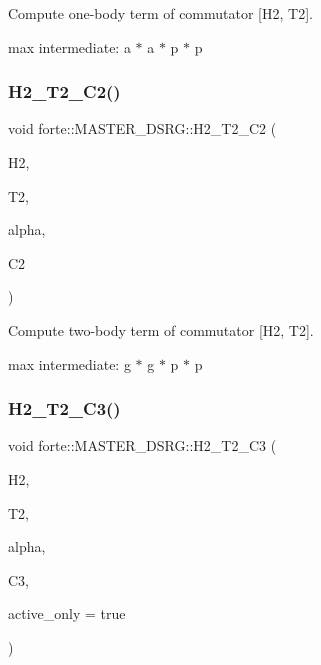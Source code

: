 Compute one-\/body term of commutator \mbox{[}H2, T2\mbox{]}. 

max intermediate\+: a $\ast$ a $\ast$ p $\ast$ p \mbox{\label{classforte_1_1_m_a_s_t_e_r___d_s_r_g_a39a44ecb9997a978aecd58d470712c1c}} 
\subsubsection{\texorpdfstring{H2\+\_\+\+T2\+\_\+\+C2()}{H2\_T2\_C2()}}
{\footnotesize\ttfamily void forte\+::\+M\+A\+S\+T\+E\+R\+\_\+\+D\+S\+R\+G\+::\+H2\+\_\+\+T2\+\_\+\+C2 (\begin{DoxyParamCaption}\item[{Blocked\+Tensor \&}]{H2,  }\item[{Blocked\+Tensor \&}]{T2,  }\item[{const double \&}]{alpha,  }\item[{Blocked\+Tensor \&}]{C2 }\end{DoxyParamCaption})\hspace{0.3cm}{\ttfamily [protected]}}



Compute two-\/body term of commutator \mbox{[}H2, T2\mbox{]}. 

max intermediate\+: g $\ast$ g $\ast$ p $\ast$ p \mbox{\label{classforte_1_1_m_a_s_t_e_r___d_s_r_g_af283b5833cb6b33ec6b5fea49bb8dd3c}} 
\subsubsection{\texorpdfstring{H2\+\_\+\+T2\+\_\+\+C3()}{H2\_T2\_C3()}}
{\footnotesize\ttfamily void forte\+::\+M\+A\+S\+T\+E\+R\+\_\+\+D\+S\+R\+G\+::\+H2\+\_\+\+T2\+\_\+\+C3 (\begin{DoxyParamCaption}\item[{Blocked\+Tensor \&}]{H2,  }\item[{Blocked\+Tensor \&}]{T2,  }\item[{const double \&}]{alpha,  }\item[{Blocked\+Tensor \&}]{C3,  }\item[{const bool \&}]{active\+\_\+only = {\ttfamily true} }\end{DoxyParamCaption})\hspace{0.3cm}{\ttfamily [protected]}}



